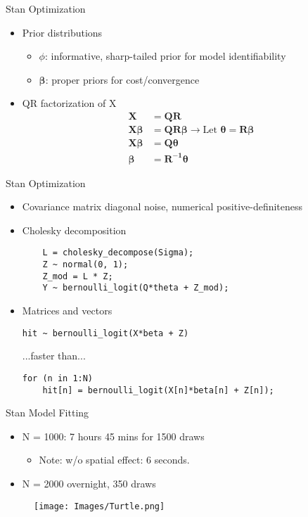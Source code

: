 \documentclass{beamer}
\begin{document}
\begin{frame}[fragile]{Stan Optimization}{}
\begin{itemize}
\addtolength{\itemsep}{0.5\baselineskip}
\item Prior distributions
  \begin{itemize}
  \addtolength{\itemsep}{0.5\baselineskip}
  \item $\phi$: informative, sharp-tailed prior for model identifiability
  \item  $\pmb{\beta}$: proper priors for cost/convergence
  \end{itemize}
\item QR factorization of X
\begin{align*}
\pmb{X} &= \pmb{QR} \\
\pmb{X \beta} &= \pmb{QR \beta} \rightarrow \text{Let } \pmb{\theta} = \pmb{R \beta} \\
\pmb{X \beta} &= \pmb{Q \theta} \\
\pmb{\beta} &= \pmb{R^{-1}\theta}
\end{align*}
\end{itemize}
\end{frame}

\begin{frame}[fragile]{Stan Optimization}{}
\begin{itemize}
\addtolength{\itemsep}{0.5\baselineskip}
\item Covariance matrix diagonal noise, numerical positive-definiteness
\item Cholesky decomposition
    \begin{verbatim}
    L = cholesky_decompose(Sigma);
    Z ~ normal(0, 1);
    Z_mod = L * Z;
    Y ~ bernoulli_logit(Q*theta + Z_mod);
    \end{verbatim}
\item Matrices and vectors
\begin{verbatim}
hit ~ bernoulli_logit(X*beta + Z)
\end{verbatim}
...faster than...
\begin{verbatim}
for (n in 1:N)
    hit[n] = bernoulli_logit(X[n]*beta[n] + Z[n]);
\end{verbatim}
\end{itemize}
\end{frame}


\begin{frame}{Stan Model Fitting} %
\begin{itemize}
\addtolength{\itemsep}{0.5\baselineskip}
\item N = 1000: 7 hours 45 mins for 1500 draws
  \begin{itemize}
  \item Note: w/o spatial effect: 6 seconds.
  \end{itemize}
\item N = 2000 overnight, 350 draws
\end{itemize}
  \begin{figure}[H]
	\centering
	\texttt{[image: Images/Turtle.png]}
	\end{figure}
\end{frame}
\end{document}
